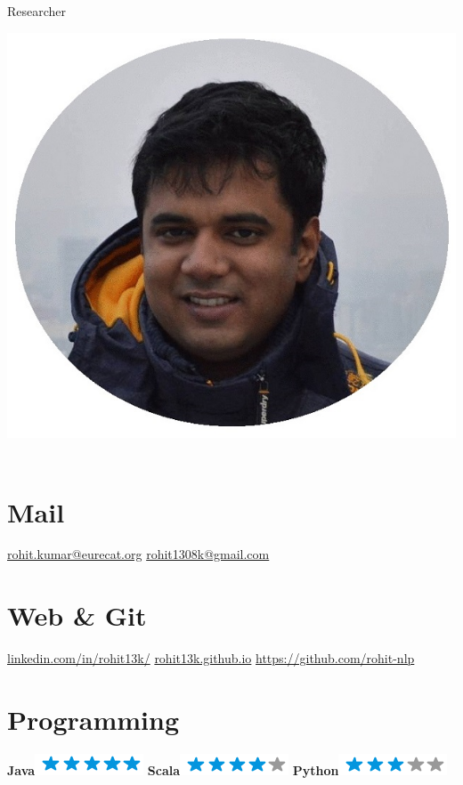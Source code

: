 \documentclass[]{friggeri-cv}
\begin{document}
	{Researcher}
	
	
	\begin{aside}
	  \includegraphics[scale=0.30]{img/meg2.jpg}
		~
		\section{Mail}
		\href{mailto:rohit.kumar@eurecat.org}{rohit.kumar@eurecat.org}
	\href{mailto:rohit1308k@gmail.com}{rohit1308k@gmail.com}
		~
		\section{Web \& Git}
		\href{https://www.linkedin.com/in/rohit13k/}{linkedin.com/in/rohit13k/}
	\href{rohit13k.github.io}{rohit13k.github.io}
	\href{https://github.com/rohit-nlp}{https://github.com/rohit-nlp}
		~
		\section{Programming}
			\textbf{Java}\includegraphics[scale=0.40]{img/5stars.png}
		\textbf{Scala}\includegraphics[scale=0.40]{img/4stars.png}
		\textbf{Python}\includegraphics[scale=0.40]{img/3stars.png}
		~

\end{aside}
\end{document}
